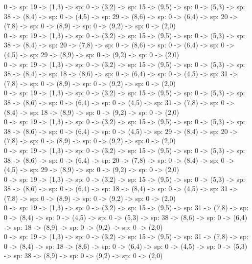 \documentclass[10pt,a4paper]{article}
\begin{document}
0 -> sp: 19 -> (1,3) -> sp: 0 -> (3,2) -> sp: 15 -> (9,5) -> sp: 0 -> (5,3) -> sp: 38 -> (8,4) -> sp: 0 -> (4,5) -> sp: 29 -> (8,6) -> sp: 0 -> (6,4) -> sp: 20 -> (7,8) -> sp: 0 -> (8,9) -> sp: 0 -> (9,2) -> sp: 0 -> (2,0)\\

0 -> sp: 19 -> (1,3) -> sp: 0 -> (3,2) -> sp: 15 -> (9,5) -> sp: 0 -> (5,3) -> sp: 38 -> (8,4) -> sp: 20 -> (7,8) -> sp: 0 -> (8,6) -> sp: 0 -> (6,4) -> sp: 0 -> (4,5) -> sp: 29 -> (8,9) -> sp: 0 -> (9,2) -> sp: 0 -> (2,0)\\

0 -> sp: 19 -> (1,3) -> sp: 0 -> (3,2) -> sp: 15 -> (9,5) -> sp: 0 -> (5,3) -> sp: 38 -> (8,4) -> sp: 18 -> (8,6) -> sp: 0 -> (6,4) -> sp: 0 -> (4,5) -> sp: 31 -> (7,8) -> sp: 0 -> (8,9) -> sp: 0 -> (9,2) -> sp: 0 -> (2,0)\\

0 -> sp: 19 -> (1,3) -> sp: 0 -> (3,2) -> sp: 15 -> (9,5) -> sp: 0 -> (5,3) -> sp: 38 -> (8,6) -> sp: 0 -> (6,4) -> sp: 0 -> (4,5) -> sp: 31 -> (7,8) -> sp: 0 -> (8,4) -> sp: 18 -> (8,9) -> sp: 0 -> (9,2) -> sp: 0 -> (2,0)\\

0 -> sp: 19 -> (1,3) -> sp: 0 -> (3,2) -> sp: 15 -> (9,5) -> sp: 0 -> (5,3) -> sp: 38 -> (8,6) -> sp: 0 -> (6,4) -> sp: 0 -> (4,5) -> sp: 29 -> (8,4) -> sp: 20 -> (7,8) -> sp: 0 -> (8,9) -> sp: 0 -> (9,2) -> sp: 0 -> (2,0)\\

0 -> sp: 19 -> (1,3) -> sp: 0 -> (3,2) -> sp: 15 -> (9,5) -> sp: 0 -> (5,3) -> sp: 38 -> (8,6) -> sp: 0 -> (6,4) -> sp: 20 -> (7,8) -> sp: 0 -> (8,4) -> sp: 0 -> (4,5) -> sp: 29 -> (8,9) -> sp: 0 -> (9,2) -> sp: 0 -> (2,0)\\

0 -> sp: 19 -> (1,3) -> sp: 0 -> (3,2) -> sp: 15 -> (9,5) -> sp: 0 -> (5,3) -> sp: 38 -> (8,6) -> sp: 0 -> (6,4) -> sp: 18 -> (8,4) -> sp: 0 -> (4,5) -> sp: 31 -> (7,8) -> sp: 0 -> (8,9) -> sp: 0 -> (9,2) -> sp: 0 -> (2,0)\\

0 -> sp: 19 -> (1,3) -> sp: 0 -> (3,2) -> sp: 15 -> (9,5) -> sp: 31 -> (7,8) -> sp: 0 -> (8,4) -> sp: 0 -> (4,5) -> sp: 0 -> (5,3) -> sp: 38 -> (8,6) -> sp: 0 -> (6,4) -> sp: 18 -> (8,9) -> sp: 0 -> (9,2) -> sp: 0 -> (2,0)\\

0 -> sp: 19 -> (1,3) -> sp: 0 -> (3,2) -> sp: 15 -> (9,5) -> sp: 31 -> (7,8) -> sp: 0 -> (8,4) -> sp: 18 -> (8,6) -> sp: 0 -> (6,4) -> sp: 0 -> (4,5) -> sp: 0 -> (5,3) -> sp: 38 -> (8,9) -> sp: 0 -> (9,2) -> sp: 0 -> (2,0)\\
\end{document}
